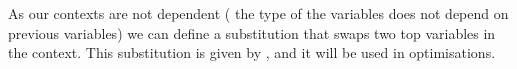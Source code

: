 \begin{code}[hide]
\AgdaSymbol{:}\AgdaSpace{}%
\AgdaSpace{}%
\AgdaSpace{}%
\AgdaSpace{}%
\AgdaSpace{}%
\AgdaSpace{}%
\AgdaSpace{}%
\AgdaSpace{}%
\AgdaSpace{}%
\AgdaSpace{}%
\AgdaSpace{}%
\<%
\\
%
\>[2]\AgdaSpace{}%
\AgdaSpace{}%
\AgdaSpace{}%
\AgdaSymbol{=}\AgdaSpace{}%
\<%
\\
%
\>[2]\AgdaSymbol{(}\AgdaSpace{}%
\AgdaSpace{}%
\AgdaSymbol{)}\AgdaSpace{}%
\AgdaSpace{}%
\AgdaSpace{}%
\AgdaSymbol{=}\AgdaSpace{}%
\AgdaSymbol{(}\AgdaSpace{}%
\AgdaSpace{}%
\AgdaSymbol{)}\AgdaSpace{}%
\AgdaSpace{}%
\AgdaSpace{}%
\AgdaSpace{}%
\<%
\end{code}
As our contexts are not dependent (\eg{} the type of the variables does not
depend on previous variables) we can define a substitution that swaps two top
variables in the context.  This substitution is given by , and it
will be used in optimisations.
\begin{mathpar}
\end{mathpar}


